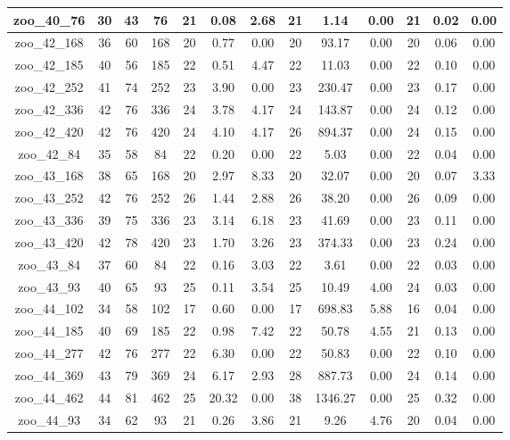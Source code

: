 \begin{landscape}
\begin{longtable}{|c|c|c|c|c|c|c|c|c|c|c|c|c|}
zoo\_40\_76 & 30 & 43 & 76 & 21 & 0.08 & 2.68 & 21 & 1.14 & 0.00 & 21 & 0.02 & 0.00 \\ \hline 
zoo\_42\_168 & 36 & 60 & 168 & 20 & 0.77 & 0.00 & 20 & 93.17 & 0.00 & 20 & 0.06 & 0.00 \\ \hline 
zoo\_42\_185 & 40 & 56 & 185 & 22 & 0.51 & 4.47 & 22 & 11.03 & 0.00 & 22 & 0.10 & 0.00 \\ \hline 
zoo\_42\_252 & 41 & 74 & 252 & 23 & 3.90 & 0.00 & 23 & 230.47 & 0.00 & 23 & 0.17 & 0.00 \\ \hline 
zoo\_42\_336 & 42 & 76 & 336 & 24 & 3.78 & 4.17 & 24 & 143.87 & 0.00 & 24 & 0.12 & 0.00 \\ \hline 
zoo\_42\_420 & 42 & 76 & 420 & 24 & 4.10 & 4.17 & 26 & 894.37 & 0.00 & 24 & 0.15 & 0.00 \\ \hline 
zoo\_42\_84 & 35 & 58 & 84 & 22 & 0.20 & 0.00 & 22 & 5.03 & 0.00 & 22 & 0.04 & 0.00 \\ \hline 
zoo\_43\_168 & 38 & 65 & 168 & 20 & 2.97 & 8.33 & 20 & 32.07 & 0.00 & 20 & 0.07 & 3.33 \\ \hline 
zoo\_43\_252 & 42 & 76 & 252 & 26 & 1.44 & 2.88 & 26 & 38.20 & 0.00 & 26 & 0.09 & 0.00 \\ \hline 
zoo\_43\_336 & 39 & 75 & 336 & 23 & 3.14 & 6.18 & 23 & 41.69 & 0.00 & 23 & 0.11 & 0.00 \\ \hline 
zoo\_43\_420 & 42 & 78 & 420 & 23 & 1.70 & 3.26 & 23 & 374.33 & 0.00 & 23 & 0.24 & 0.00 \\ \hline 
zoo\_43\_84 & 37 & 60 & 84 & 22 & 0.16 & 3.03 & 22 & 3.61 & 0.00 & 22 & 0.03 & 0.00 \\ \hline 
zoo\_43\_93 & 40 & 65 & 93 & 25 & 0.11 & 3.54 & 25 & 10.49 & 4.00 & 24 & 0.03 & 0.00 \\ \hline 
zoo\_44\_102 & 34 & 58 & 102 & 17 & 0.60 & 0.00 & 17 & 698.83 & 5.88 & 16 & 0.04 & 0.00 \\ \hline 
zoo\_44\_185 & 40 & 69 & 185 & 22 & 0.98 & 7.42 & 22 & 50.78 & 4.55 & 21 & 0.13 & 0.00 \\ \hline 
zoo\_44\_277 & 42 & 76 & 277 & 22 & 6.30 & 0.00 & 22 & 50.83 & 0.00 & 22 & 0.10 & 0.00 \\ \hline 
zoo\_44\_369 & 43 & 79 & 369 & 24 & 6.17 & 2.93 & 28 & 887.73 & 0.00 & 24 & 0.14 & 0.00 \\ \hline 
zoo\_44\_462 & 44 & 81 & 462 & 25 & 20.32 & 0.00 & 38 & 1346.27 & 0.00 & 25 & 0.32 & 0.00 \\ \hline 
zoo\_44\_93 & 34 & 62 & 93 & 21 & 0.26 & 3.86 & 21 & 9.26 & 4.76 & 20 & 0.04 & 0.00 \\ \hline 

\end{longtable}
\end{landscape}
